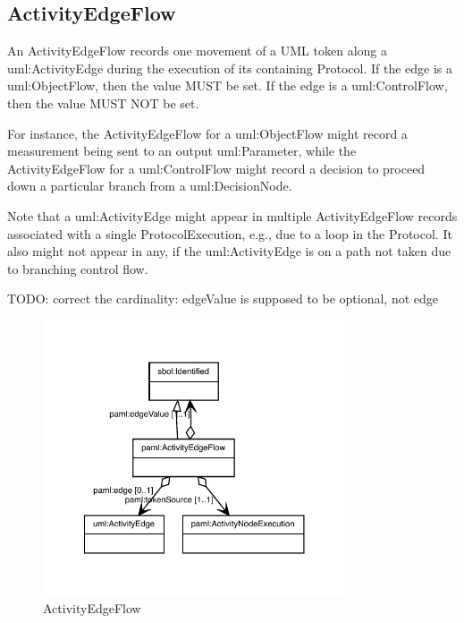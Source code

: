 \subsection{ActivityEdgeFlow}%
\label{sec:paml:ActivityEdgeFlow}%
An ActivityEdgeFlow records one movement of a UML token along a uml:ActivityEdge during the
        execution of its containing Protocol. If the edge is a uml:ObjectFlow, then the value MUST be set.
        If the edge is a uml:ControlFlow, then the value MUST NOT be set.

        For instance, the ActivityEdgeFlow for a uml:ObjectFlow might record a measurement being sent to an output
        uml:Parameter, while the ActivityEdgeFlow for a uml:ControlFlow might record a decision to proceed down a
        particular branch from a uml:DecisionNode.

        Note that a uml:ActivityEdge might appear in multiple ActivityEdgeFlow records associated with a single
        ProtocolExecution, e.g., due to a loop in the Protocol.  It also might not appear in any, if the
        uml:ActivityEdge is on a path not taken due to branching control flow.

        TODO: correct the cardinality: edgeValue is supposed to be optional, not edge
\linebreak%
\linebreak%


\begin{figure}[h!]%
\centering%
\includegraphics[width=0.8\textwidth]{paml_classes/ActivityEdgeFlow_abstraction_hierarchy.pdf}%
\caption{ActivityEdgeFlow}%
\label{fig:ActivityEdgeFlow}%
\end{figure}

